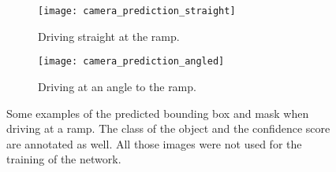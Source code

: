 \begin{figure}[htb]
    \centering
    \begin{subfigure}{1\textwidth}
        \centering
        \texttt{[image: camera\_prediction\_straight]}
        \caption{Driving straight at the ramp.}
        \label{fig:camera_prediction_straight}
    \end{subfigure}
    
    \begin{subfigure}{1\textwidth}
        \centering
        \texttt{[image: camera\_prediction\_angled]}
        \caption{Driving at an angle to the ramp.}
        \label{fig:camera_prediction_angled}
    \end{subfigure}
    \caption[Visualization examples of predicted segmentation masks]{Some examples of the predicted bounding box and mask when driving at a ramp. The class of the object and the confidence score are annotated as well. All those images were not used for the training of the network.}
\end{figure}


